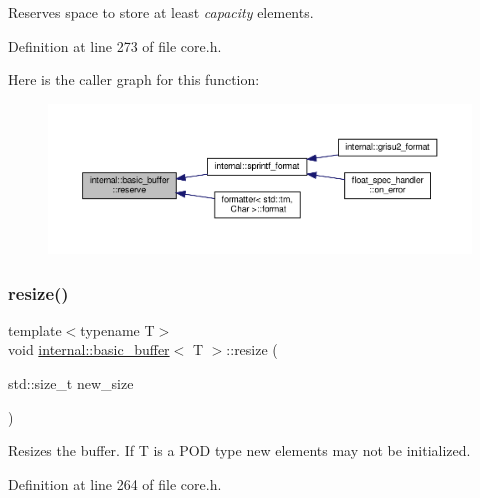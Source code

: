 Reserves space to store at least {\itshape capacity} elements. 

Definition at line 273 of file core.\+h.

Here is the caller graph for this function\+:
\nopagebreak
\begin{figure}[H]
\begin{center}
\leavevmode
\includegraphics[width=350pt]{classinternal_1_1basic__buffer_ab4bbc728c01282567eebc165d545772a_icgraph}
\end{center}
\end{figure}
\mbox{\label{classinternal_1_1basic__buffer_adbd2b147e114f0cc4573f734d4326669}} 
\subsubsection{\texorpdfstring{resize()}{resize()}}
{\footnotesize\ttfamily template$<$typename T$>$ \\
void \hyperlink{classinternal_1_1basic__buffer}{internal\+::basic\+\_\+buffer}$<$ T $>$\+::resize (\begin{DoxyParamCaption}\item[{std\+::size\+\_\+t}]{new\+\_\+size }\end{DoxyParamCaption})\hspace{0.3cm}{\ttfamily [inline]}}

Resizes the buffer. If T is a P\+OD type new elements may not be initialized. 

Definition at line 264 of file core.\+h.

